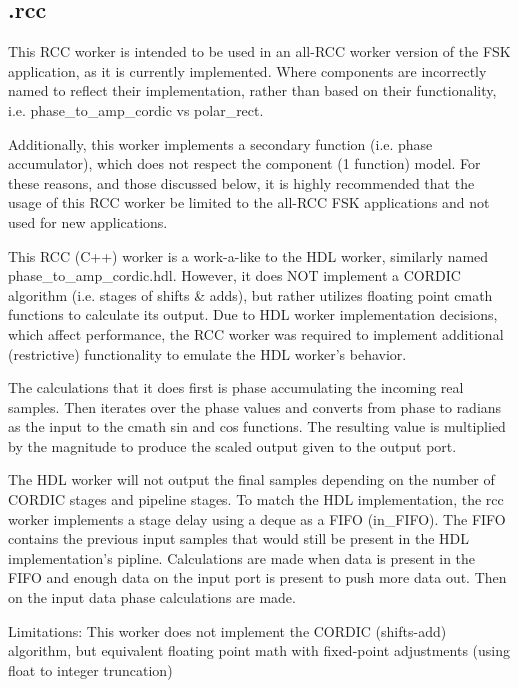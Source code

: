 \subsection*{\comp.rcc}
\begin{flushleft}
This RCC worker is intended to be used in an all-RCC worker version of the FSK application,
as it is currently implemented.  Where components are incorrectly named to reflect their implementation, rather than based on their functionality, i.e. phase\_to\_amp\_cordic vs polar\_rect.\medskip

Additionally, this worker implements a secondary function (i.e. phase accumulator), which
does not respect the component (1 function) model.
For these reasons, and those discussed below, it is highly recommended that the usage
of this RCC worker be limited to the all-RCC FSK applications and not used for new applications.\medskip

This RCC (C++) worker is a work-a-like to the HDL worker, similarly named phase\_to\_amp\_cordic.hdl.
However, it does NOT implement a CORDIC algorithm (i.e. stages of shifts \& adds),
but rather utilizes floating point cmath functions to calculate its output.
Due to HDL worker implementation decisions, which affect performance, the RCC worker
was required to implement additional (restrictive) functionality to emulate the HDL worker's
behavior.\medskip

The calculations that it does first is phase accumulating the incoming real samples. 
Then iterates over the phase values and converts from phase to radians as the input to the cmath sin and cos functions.
The resulting value is multiplied by the magnitude to produce the scaled output given to the output port.\medskip

The HDL worker will not output the final samples depending on the number of CORDIC stages and pipeline stages. 
To match the HDL implementation, the rcc worker implements a stage delay using a deque as a FIFO (in\_FIFO).
The FIFO contains the previous input samples that would still be present in the HDL implementation's pipline. 
Calculations are made when data is present in the FIFO and enough data on the input port is present to push more data out.
Then on the input data phase calculations are made.\medskip

Limitations:  
This worker does not implement the CORDIC (shifts-add) algorithm, 
but equivalent floating point math with fixed-point adjustments (using float to integer truncation)\medskip
\end{flushleft}


